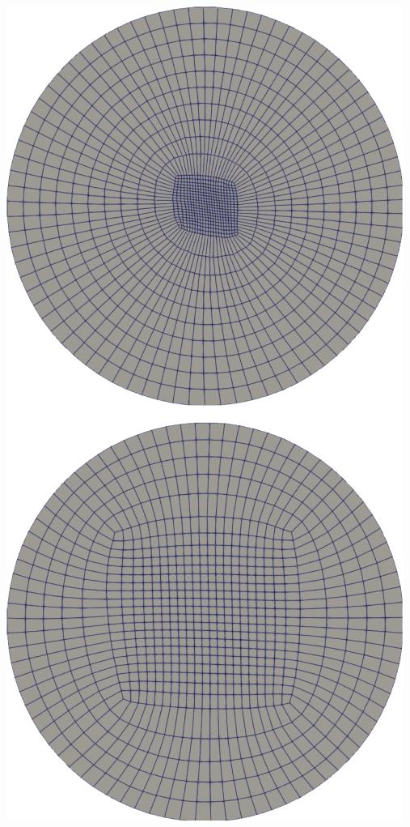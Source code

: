 \documentclass[compress,10pt,aspectratio=169]{beamer}
\begin{document}
\begin{frame}
\begin{columns}
\begin{column}{0.32\textwidth}
{    \includegraphics[scale=0.35]{images/explosion.pdf}
\vspace{0.25cm}
}
\end{column}
\end{columns}
\end{frame}
\end{document}
